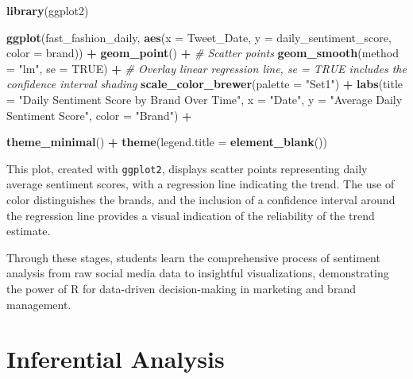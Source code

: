 \documentclass[
]{book}
\newenvironment{Shaded}{\begin{snugshade}}{\end{snugshade}}
\newcommand{\AttributeTok}[1]{\textcolor[rgb]{0.13,0.29,0.53}{#1}}
\newcommand{\CommentTok}[1]{\textcolor[rgb]{0.56,0.35,0.01}{\textit{#1}}}
\newcommand{\ConstantTok}[1]{\textcolor[rgb]{0.56,0.35,0.01}{#1}}
\newcommand{\FunctionTok}[1]{\textcolor[rgb]{0.13,0.29,0.53}{\textbf{#1}}}
\newcommand{\NormalTok}[1]{#1}
\newcommand{\SpecialCharTok}[1]{\textcolor[rgb]{0.81,0.36,0.00}{\textbf{#1}}}
\newcommand{\StringTok}[1]{\textcolor[rgb]{0.31,0.60,0.02}{#1}}
\begin{document}
\begin{Shaded}
\begin{Highlighting}[]
\FunctionTok{library}\NormalTok{(ggplot2)}

\FunctionTok{ggplot}\NormalTok{(fast\_fashion\_daily, }\FunctionTok{aes}\NormalTok{(}\AttributeTok{x =}\NormalTok{ Tweet\_Date, }\AttributeTok{y =}\NormalTok{ daily\_sentiment\_score, }\AttributeTok{color =}\NormalTok{ brand)) }\SpecialCharTok{+}
  \FunctionTok{geom\_point}\NormalTok{() }\SpecialCharTok{+}  \CommentTok{\# Scatter points}
  \FunctionTok{geom\_smooth}\NormalTok{(}\AttributeTok{method =} \StringTok{"lm"}\NormalTok{, }\AttributeTok{se =} \ConstantTok{TRUE}\NormalTok{) }\SpecialCharTok{+}  \CommentTok{\# Overlay linear regression line, se = TRUE includes the confidence interval shading}
  \FunctionTok{scale\_color\_brewer}\NormalTok{(}\AttributeTok{palette =} \StringTok{"Set1"}\NormalTok{) }\SpecialCharTok{+}
  \FunctionTok{labs}\NormalTok{(}\AttributeTok{title =} \StringTok{"Daily Sentiment Score by Brand Over Time"}\NormalTok{,}
       \AttributeTok{x =} \StringTok{"Date"}\NormalTok{,}
       \AttributeTok{y =} \StringTok{"Average Daily Sentiment Score"}\NormalTok{,}
       \AttributeTok{color =} \StringTok{"Brand"}\NormalTok{) }\SpecialCharTok{+}
 

 \FunctionTok{theme\_minimal}\NormalTok{() }\SpecialCharTok{+}
  \FunctionTok{theme}\NormalTok{(}\AttributeTok{legend.title =} \FunctionTok{element\_blank}\NormalTok{())}
\end{Highlighting}
\end{Shaded}

This plot, created with \texttt{ggplot2}, displays scatter points representing daily average sentiment scores, with a regression line indicating the trend. The use of color distinguishes the brands, and the inclusion of a confidence interval around the regression line provides a visual indication of the reliability of the trend estimate.

Through these stages, students learn the comprehensive process of sentiment analysis from raw social media data to insightful visualizations, demonstrating the power of R for data-driven decision-making in marketing and brand management.

\hypertarget{inferential-analysis}{%
\chapter{Inferential Analysis}\label{inferential-analysis}}
\end{document}
